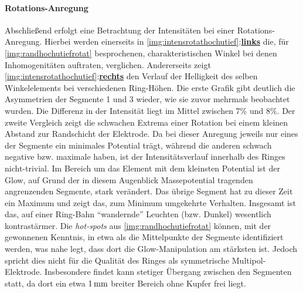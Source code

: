 \documentclass[numbers=noenddot,a4paper,notitlepage,twoside,BCOR15mm]{scrbook}
\newcommand{\tilt}[1]{\textit{#1}}
\newcommand{\fett}[1]{\textbf{#1}}
\begin{document}
				\paragraph{Rotations-Anregung}

					Abschließend erfolgt eine Betrachtung der Intensitäten bei einer Rotations-Anregung. Hierbei werden einerseits in \ref{img:intensrotathochutief}:\underline{\fett{links}} die, für \ref{img:randhochutiefrotat} besprochenen, charakteristischen Winkel bei denen Inhomogenitäten auftraten, verglichen. Andererseits zeigt \ref{img:intensrotathochutief}:\underline{\fett{rechts}} den Verlauf der Helligkeit des selben Winkelelements bei verschiedenen Ring-Höhen. Die erste Grafik gibt deutlich die Asymmetrien der Segmente 1 und 3 wieder, wie sie zuvor mehrmals beobachtet wurden. Die Differenz in der Intensität liegt im Mittel zwischen 7\% und 8\%. Der zweite Vergleich zeigt die schwachen Extrema einer Rotation bei einem kleinen Abstand zur Randschicht der Elektrode. Da bei dieser Anregung jeweils nur eines der Segmente ein minimales Potential tr\"agt, w\"ahrend die anderen schwach negative bzw. maximale haben, ist der Intensitätsverlauf innerhalb des Ringes nicht-trivial. Im Bereich um das Element mit dem kleinsten Potential ist der Glow, auf Grund der in diesem Augenblick Massepotential tragenden angrenzenden Segmente, stark verändert. Das \"ubrige Segment hat zu dieser Zeit ein Maximum und zeigt das, zum Minimum umgekehrte Verhalten. Insgesamt ist das, auf einer Ring-Bahn ``wandernde'' Leuchten (bzw. Dunkel) wesentlich kontrast\"armer. Die \tilt{hot-spots} aus \ref{img:randhochutiefrotat} k\"onnen, mit der gewonnenen Kenntnis, in etwa als die Mittelpunkte der Segmente identifiziert werden, was nahe legt, dass dort die Glow-Manipulation am st\"arksten ist. Jedoch spricht dies nicht f\"ur die Qualit\"at des Ringes als symmetrische Multipol-Elektrode. Insbesondere findet kann stetiger Übergang zwischen den Segmenten statt, da dort ein etwa $\unit[1]{mm}$ breiter Bereich ohne Kupfer frei liegt.

\end{document}
